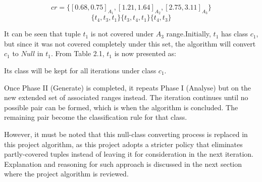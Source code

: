 \begin{description}
\[ cr = \{[0.68, 0.75]_{A_1}, [1.21,1.64]_{A_2}, [2.75,3.11]_{A_3}\} \] 
\[ \{t_4,t_3,t_1\} { } \{t_3,t_4,t_1\} { } \{t_4, t_3\} \] 

It can be seen that tuple $t_1$ is not covered under $A_3$ range.Initially, $t_1$ has class $c_1$, but since it was not covered completely under this set, the algorithm will convert $c_1$ to $Null$ in $t_1$. From Table 2.1, $t_1$ is now presented as: 



Its class will be kept for all iterations under class $c_1$. 

Once Phase II (Generate) is completed, it repeats Phase I (Analyse) but on the new extended set of associated ranges instead. The iteration continues until no possible pair can be formed, which is when the algorithm is concluded. The remaining pair become the classification rule for that class. 

However, it must be noted that this null-class converting process is replaced in this project algorithm, as this project adopts a stricter policy that eliminates partly-covered tuples instead of leaving it for consideration in the next iteration. Explanation and reasoning for such approach is discussed in the next section where the project algorithm is reviewed.

\end{description}
















